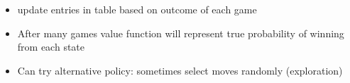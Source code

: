 \documentclass{beamer}
\begin{document}
\begin{frame}
\begin{minipage}{7cm}
\begin{itemize}
\begin{itemize}
\item update entries in table based on outcome of each game
\item After many games value function will represent true probability of winning from each state
\end{itemize}
\end{itemize}
\end{minipage}
\begin{itemize}
\item Can try alternative policy: sometimes select moves randomly (exploration)
\end{itemize}
\end{frame}
\end{document}
